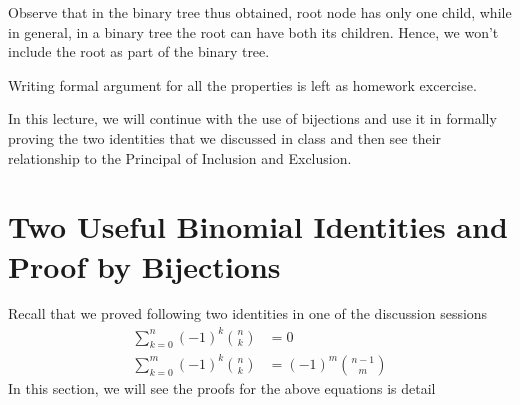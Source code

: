 Observe that in the binary tree thus obtained, root node has only one child, while in general, in a binary tree the root can have both its children. Hence, we won't include the root as part of the binary tree.

Writing formal argument for all the properties is left as homework excercise.



In this lecture, we will continue with the use of bijections and use it in formally proving the two identities that we discussed in class and then see their relationship to the Principal of Inclusion and Exclusion. 

\section{Two Useful Binomial Identities and Proof by Bijections}
Recall that we proved following two identities in one of the discussion sessions
\begin{align}
     \sum_{k=0}^n (-1)^k{n\choose k} &= 0 \label{REV1}\\ 
     \sum_{k=0}^m (-1)^k{n\choose k} &= (-1)^m{n-1\choose m} \label{REV2}
\end{align}
In this section, we will see the proofs for the above equations is detail
